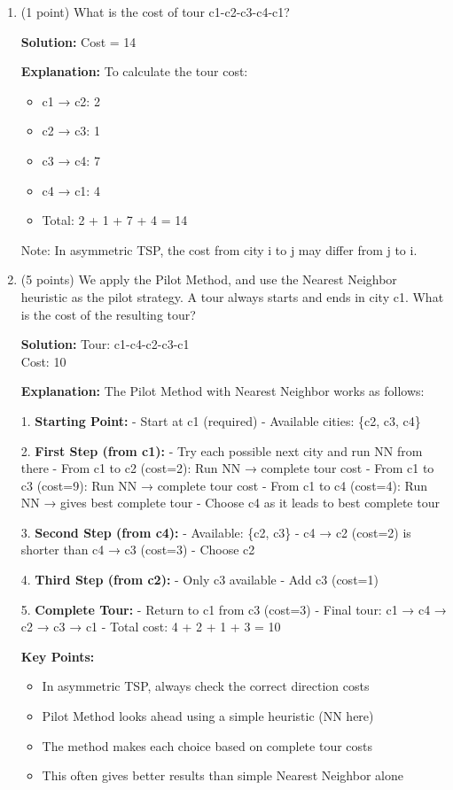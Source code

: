\begin{enumerate}[label=\alph*)]
\item (1 point) What is the cost of tour c1-c2-c3-c4-c1?

\textbf{Solution:} Cost = 14

\textbf{Explanation:}
To calculate the tour cost:
\begin{itemize}
\item c1 → c2: 2
\item c2 → c3: 1
\item c3 → c4: 7
\item c4 → c1: 4
\item Total: 2 + 1 + 7 + 4 = 14
\end{itemize}
Note: In asymmetric TSP, the cost from city i to j may differ from j to i.

\item (5 points) We apply the Pilot Method, and use the Nearest Neighbor heuristic as the pilot strategy. A tour always starts and ends in city c1. What is the cost of the resulting tour?

\textbf{Solution:} 
Tour: c1-c4-c2-c3-c1\\
Cost: 10

\textbf{Explanation:}
The Pilot Method with Nearest Neighbor works as follows:

1. \textbf{Starting Point:}
   - Start at c1 (required)
   - Available cities: \{c2, c3, c4\}

2. \textbf{First Step (from c1):}
   - Try each possible next city and run NN from there
   - From c1 to c2 (cost=2): Run NN → complete tour cost
   - From c1 to c3 (cost=9): Run NN → complete tour cost
   - From c1 to c4 (cost=4): Run NN → gives best complete tour
   - Choose c4 as it leads to best complete tour

3. \textbf{Second Step (from c4):}
   - Available: \{c2, c3\}
   - c4 → c2 (cost=2) is shorter than c4 → c3 (cost=3)
   - Choose c2

4. \textbf{Third Step (from c2):}
   - Only c3 available
   - Add c3 (cost=1)

5. \textbf{Complete Tour:}
   - Return to c1 from c3 (cost=3)
   - Final tour: c1 → c4 → c2 → c3 → c1
   - Total cost: 4 + 2 + 1 + 3 = 10

\textbf{Key Points:}
\begin{itemize}
\item In asymmetric TSP, always check the correct direction costs
\item Pilot Method looks ahead using a simple heuristic (NN here)
\item The method makes each choice based on complete tour costs
\item This often gives better results than simple Nearest Neighbor alone
\end{itemize}
\end{enumerate}

